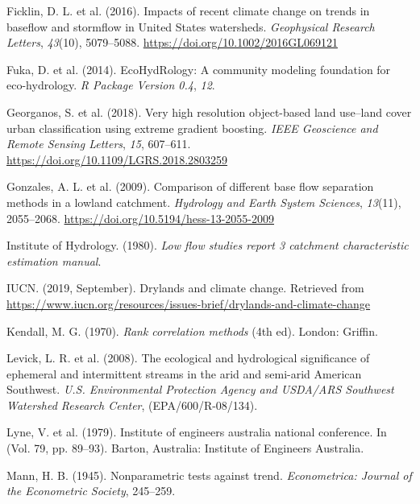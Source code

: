 \documentclass[
]{agujournal2019}
\newlength{\cslhangindent}
\newenvironment{CSLReferences}[2] %
 {\begin{list}{}{%
  \setlength{\itemindent}{0pt}
  \setlength{\leftmargin}{0pt}
  \setlength{\parsep}{0pt}
  \ifodd #1
   \setlength{\leftmargin}{\cslhangindent}
   \setlength{\itemindent}{-1\cslhangindent}
  \fi
  \setlength{\itemsep}{#2\baselineskip}}}
 {\end{list}}
\begin{document}
\begin{CSLReferences}{1}{0}
Ficklin, D. L. et al. (2016). Impacts of recent climate change on trends
in baseflow and stormflow in United States watersheds. \emph{Geophysical
Research Letters}, \emph{43}(10), 5079--5088.
\url{https://doi.org/10.1002/2016GL069121}

Fuka, D. et al. (2014). EcoHydRology: A community modeling foundation
for eco-hydrology. \emph{R Package Version 0.4}, \emph{12}.

Georganos, S. et al. (2018). Very high resolution object-based land
use--land cover urban classification using extreme gradient boosting.
\emph{IEEE Geoscience and Remote Sensing Letters}, \emph{15}, 607--611.
\url{https://doi.org/10.1109/LGRS.2018.2803259}

Gonzales, A. L. et al. (2009). Comparison of different base flow
separation methods in a lowland catchment. \emph{Hydrology and Earth
System Sciences}, \emph{13}(11), 2055--2068.
\url{https://doi.org/10.5194/hess-13-2055-2009}

Institute of Hydrology. (1980). \emph{Low flow studies report 3
catchment characteristic estimation manual}.

IUCN. (2019, September). Drylands and climate change. Retrieved from
\url{https://www.iucn.org/resources/issues-brief/drylands-and-climate-change}

Kendall, M. G. (1970). \emph{Rank correlation methods} (4th ed). London:
Griffin.

Levick, L. R. et al. (2008). {The ecological and hydrological
significance of ephemeral and intermittent streams in the arid and
semi-arid American Southwest}. \emph{U.S. Environmental Protection
Agency and USDA/ARS Southwest Watershed Research Center},
(EPA/600/R-08/134).

Lyne, V. et al. (1979). Institute of engineers australia national
conference. In (Vol. 79, pp. 89--93). Barton, Australia: Institute of
Engineers Australia.

Mann, H. B. (1945). Nonparametric tests against trend.
\emph{Econometrica: Journal of the Econometric Society}, 245--259.


\end{CSLReferences}
\end{document}
